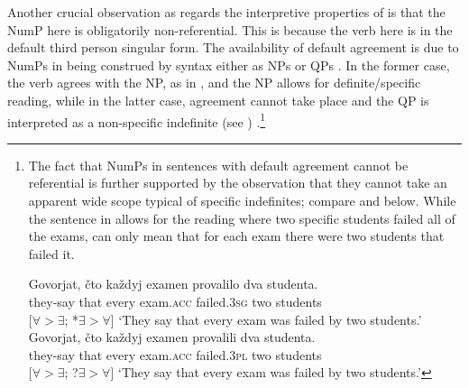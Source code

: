 \documentclass[output=paper,modfonts,newtxmath,hidelinks]{langscibook}
\begin{document}
Another crucial observation as regards the interpretive properties of  is that the NumP here is obligatorily non-referential. This is because the verb here is in the default third person singular form. The availability of default agreement is due to NumPs in  being construed by syntax either as NPs or QPs \citep{Pesetsky1982}. In the former case, the verb agrees with the  NP, as in , and the NP allows for definite/specific reading, while in the latter case, agreement cannot take place and the QP is interpreted as a non-specific indefinite (see ) \citep{Titov2012}.\footnote{\label{18:fn19}The fact that NumPs in sentences with default agreement cannot be referential is further supported by the observation that they cannot take an apparent wide scope typical of specific indefinites; compare  and  below. While the sentence in  allows for the reading where two specific students failed all of the exams,  can only mean that for each exam there were two students that failed it.   

\ea \label{18:fn19i}
\gll Govorjat, čto každyj examen provalilo dva studenta. \\
	 they-say  that  every  exam.\textsc{acc}  failed.\textsc{3sg}  two   students \\\hfill [$\forall > \exists$; *$\exists > \forall$]
\glt `They say that every exam was failed by two students.'  
\z
\ea \label{18:fn19ii}
\gll Govorjat, čto každyj examen provalili dva studenta. \\ 
	 they-say  that  every  exam.\textsc{acc}  failed.\textsc{3pl}  two   students  \\\hfill [$\forall > \exists$; ?$\exists > \forall$]
\glt `They say that every exam was failed by two students.'
\z
}  
\ea \label{18:ex23}
	\z
\z           
\end{document}
